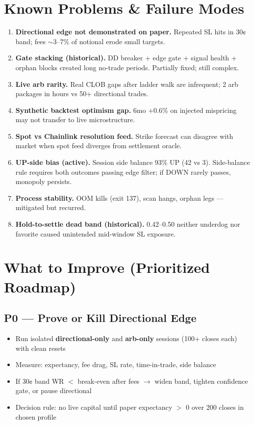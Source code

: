 \documentclass[11pt,a4paper]{article}
\begin{document}
\section{Known Problems \& Failure Modes}

\begin{enumerate}
  \item \textbf{Directional edge not demonstrated on paper.} Repeated SL hits in 30¢ band; fees $\sim$3--7\% of notional erode small targets.
  \item \textbf{Gate stacking (historical).} DD breaker + edge gate + signal health + orphan blocks created long no-trade periods. Partially fixed; still complex.
  \item \textbf{Live arb rarity.} Real CLOB gaps after ladder walk are infrequent; 2 arb packages in hours vs 50+ directional trades.
  \item \textbf{Synthetic backtest optimism gap.} 6mo +0.6\% on injected mispricing may not transfer to live microstructure.
  \item \textbf{Spot vs Chainlink resolution feed.} Strike forecast can disagree with market when spot feed diverges from settlement oracle.
  \item \textbf{UP-side bias (active).} Session side balance 93\% UP (42 vs 3). Side-balance rule requires both outcomes passing edge filter; if DOWN rarely passes, monopoly persists.
  \item \textbf{Process stability.} OOM kills (exit 137), scan hangs, orphan legs --- mitigated but recurred.
  \item \textbf{Hold-to-settle dead band (historical).} 0.42--0.50 neither underdog nor favorite caused unintended mid-window SL exposure.
\end{enumerate}

\section{What to Improve (Prioritized Roadmap)}

\subsection{P0 --- Prove or Kill Directional Edge}
\begin{itemize}
  \item Run isolated \textbf{directional-only} and \textbf{arb-only} sessions (100+ closes each) with clean resets
  \item Measure: expectancy, fee drag, SL rate, time-in-trade, side balance
  \item If 30¢ band WR $<$ break-even after fees $\rightarrow$ widen band, tighten confidence gate, or pause directional
  \item Decision rule: no live capital until paper expectancy $>$ 0 over 200 closes in chosen profile
\end{itemize}
\end{document}
